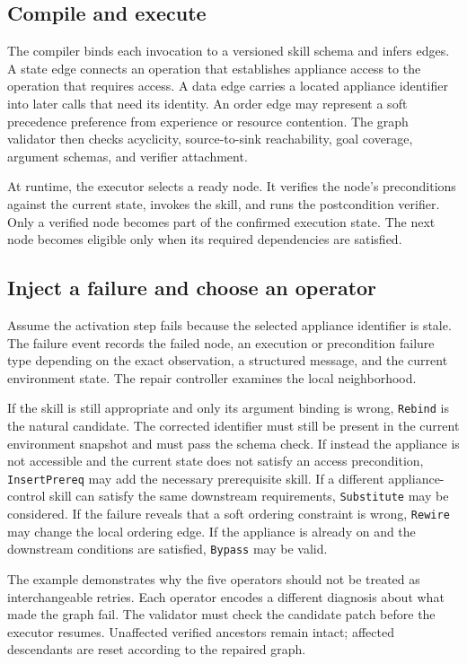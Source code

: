 \subsection{Compile and execute}

The compiler binds each invocation to a versioned skill schema and infers edges. A state edge connects an operation that establishes appliance access to the operation that requires access. A data edge carries a located appliance identifier into later calls that need its identity. An order edge may represent a soft precedence preference from experience or resource contention. The graph validator then checks acyclicity, source-to-sink reachability, goal coverage, argument schemas, and verifier attachment.

At runtime, the executor selects a ready node. It verifies the node's preconditions against the current state, invokes the skill, and runs the postcondition verifier. Only a verified node becomes part of the confirmed execution state. The next node becomes eligible only when its required dependencies are satisfied.

\subsection{Inject a failure and choose an operator}

Assume the activation step fails because the selected appliance identifier is stale. The failure event records the failed node, an execution or precondition failure type depending on the exact observation, a structured message, and the current environment state. The repair controller examines the local neighborhood.

If the skill is still appropriate and only its argument binding is wrong, \texttt{Rebind} is the natural candidate. The corrected identifier must still be present in the current environment snapshot and must pass the schema check. If instead the appliance is not accessible and the current state does not satisfy an access precondition, \texttt{InsertPrereq} may add the necessary prerequisite skill. If a different appliance-control skill can satisfy the same downstream requirements, \texttt{Substitute} may be considered. If the failure reveals that a soft ordering constraint is wrong, \texttt{Rewire} may change the local ordering edge. If the appliance is already on and the downstream conditions are satisfied, \texttt{Bypass} may be valid.

The example demonstrates why the five operators should not be treated as interchangeable retries. Each operator encodes a different diagnosis about what made the graph fail. The validator must check the candidate patch before the executor resumes. Unaffected verified ancestors remain intact; affected descendants are reset according to the repaired graph.

